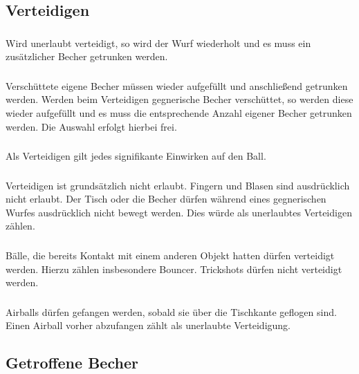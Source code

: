 \subsection{Verteidigen}\label{Bier-Pong:Verteidigen}
\subsubsection{}
Wird unerlaubt verteidigt, so wird der Wurf wiederholt und es muss ein zusätzlicher Becher getrunken werden.

\subsubsection{}
Verschüttete eigene Becher müssen wieder aufgefüllt und anschließend getrunken werden.
Werden beim Verteidigen gegnerische Becher verschüttet, so werden diese wieder aufgefüllt und es muss die entsprechende Anzahl eigener Becher getrunken werden.
Die Auswahl erfolgt hierbei frei.

\subsubsection{}
Als Verteidigen gilt jedes signifikante Einwirken auf den Ball.

\subsubsection{}
Verteidigen ist grundsätzlich nicht erlaubt.
Fingern und Blasen sind ausdrücklich nicht erlaubt.
Der Tisch oder die Becher dürfen während eines gegnerischen Wurfes ausdrücklich nicht bewegt werden.
Dies würde als unerlaubtes Verteidigen zählen.

\subsubsection{}
Bälle, die bereits Kontakt mit einem anderen Objekt hatten dürfen verteidigt werden.
Hierzu zählen insbesondere Bouncer.
Trickshots dürfen nicht verteidigt werden.

\subsubsection{}
Airballs dürfen gefangen werden, sobald sie über die Tischkante geflogen sind.
Einen Airball vorher abzufangen zählt als unerlaubte Verteidigung.

\subsection{Getroffene Becher}
